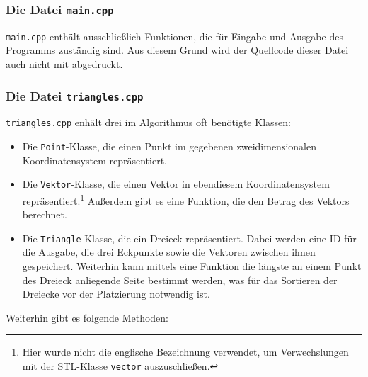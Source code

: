 \documentclass[a4paper, notitlepage, 12pt,headinclude]{scrartcl}
\begin{document}
\subsubsection{Die Datei \texttt{main.cpp}}
\texttt{main.cpp} enthält ausschließlich Funktionen, die für Eingabe und Ausgabe des Programms zuständig sind. Aus diesem Grund wird der Quellcode dieser Datei auch nicht mit abgedruckt.
\subsubsection{Die Datei \texttt{triangles.cpp}}
\texttt{triangles.cpp} enhält drei im Algorithmus oft benötigte Klassen:
\begin{itemize}
	\item Die \texttt{Point}-Klasse, die einen Punkt im gegebenen zweidimensionalen Koordinatensystem repräsentiert.
	\item Die \texttt{Vektor}-Klasse, die einen Vektor in ebendiesem Koordinatensystem repräsentiert.\footnote{Hier wurde nicht die englische Bezeichnung verwendet, um Verwechslungen mit der STL-Klasse \texttt{vector} auszuschließen.} Außerdem gibt es eine Funktion, die den Betrag des Vektors berechnet.
	\item Die \texttt{Triangle}-Klasse, die ein Dreieck repräsentiert. Dabei werden eine ID für die Ausgabe, die drei Eckpunkte sowie die Vektoren zwischen ihnen gespeichert. Weiterhin kann mittels eine Funktion die längste an einem Punkt des Dreieck anliegende Seite bestimmt werden, was für das Sortieren der Dreiecke vor der Platzierung notwendig ist.
\end{itemize}
Weiterhin gibt es folgende Methoden: \\
\end{document}
